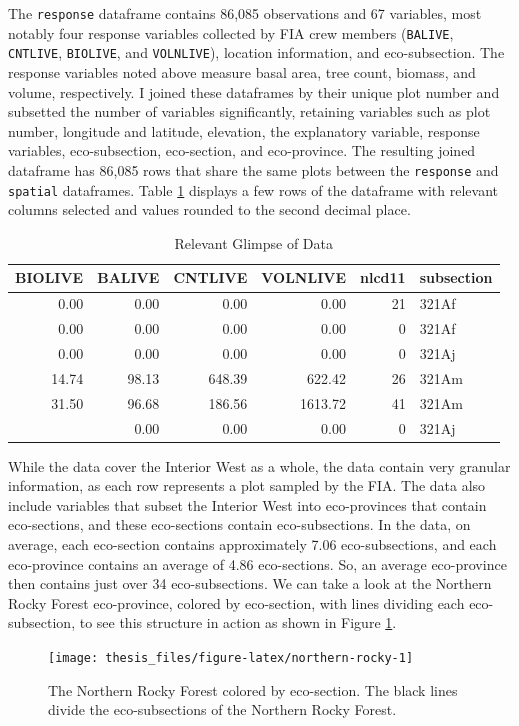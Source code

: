 \documentclass[12pt,twoside]{reedthesis}
\begin{document}
The \texttt{response} dataframe contains 86,085 observations and 67 variables, most notably four response variables collected by FIA crew members (\texttt{BALIVE}, \texttt{CNTLIVE}, \texttt{BIOLIVE}, and \texttt{VOLNLIVE}), location information, and eco-subsection. The response variables noted above measure basal area, tree count, biomass, and volume, respectively. I joined these dataframes by their unique plot number and subsetted the number of variables significantly, retaining variables such as plot number, longitude and latitude, elevation, the explanatory variable, response variables, eco-subsection, eco-section, and eco-province. The resulting joined dataframe has 86,085 rows that share the same plots between the \texttt{response} and \texttt{spatial} dataframes. Table \ref{tab:firsttab} displays a few rows of the dataframe with relevant columns selected and values rounded to the second decimal place.
\clearpage
\begin{longtable}[t]{rrrrrl}
\caption[Relevant Glimpse of Data]{\label{tab:firsttab}Relevant Glimpse of Data}\\
\toprule
BIOLIVE & BALIVE & CNTLIVE & VOLNLIVE & nlcd11 & subsection\\
\midrule
0.00 & 0.00 & 0.00 & 0.00 & 21 & 321Af\\
0.00 & 0.00 & 0.00 & 0.00 & 0 & 321Af\\
0.00 & 0.00 & 0.00 & 0.00 & 0 & 321Aj\\
14.74 & 98.13 & 648.39 & 622.42 & 26 & 321Am\\
31.50 & 96.68 & 186.56 & 1613.72 & 41 & 321Am\\
\addlinespace
0.00 & 0.00 & 0.00 & 0.00 & 0 & 321Aj\\
\bottomrule
\end{longtable}
While the data cover the Interior West as a whole, the data contain very granular information, as each row represents a plot sampled by the FIA. The data also include variables that subset the Interior West into eco-provinces that contain eco-sections, and these eco-sections contain eco-subsections. In the data, on average, each eco-section contains approximately 7.06 eco-subsections, and each eco-province contains an average of 4.86 eco-sections. So, an average eco-province then contains just over 34 eco-subsections. We can take a look at the Northern Rocky Forest eco-province, colored by eco-section, with lines dividing each eco-subsection, to see this structure in action as shown in Figure \ref{fig:northern-rocky}.
\clearpage
\begin{figure}

{\centering \texttt{[image: thesis\_files/figure-latex/northern-rocky-1]} 

}

\caption[The Northern Rocky Forest colored by eco-section]{The Northern Rocky Forest colored by eco-section. The black lines divide the eco-subsections of the Northern Rocky Forest.}\label{fig:northern-rocky}
\end{figure}
\end{document}
